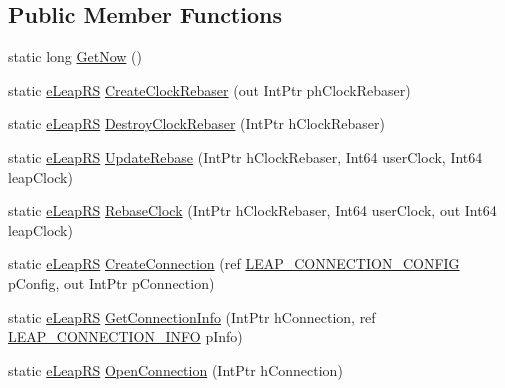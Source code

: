 \subsection*{Public Member Functions}
\begin{DoxyCompactItemize}
\item 
static long \mbox{\hyperlink{class_leap_internal_1_1_leap_c_a92e9bb730041df4094e328bcf326da47}{Get\+Now}} ()
\item 
static \mbox{\hyperlink{namespace_leap_internal_ae50b07d24c508b84273392b6dcbea1d9}{e\+Leap\+RS}} \mbox{\hyperlink{class_leap_internal_1_1_leap_c_aff89b9602b8eae92c47079d89d4be8fc}{Create\+Clock\+Rebaser}} (out Int\+Ptr ph\+Clock\+Rebaser)
\item 
static \mbox{\hyperlink{namespace_leap_internal_ae50b07d24c508b84273392b6dcbea1d9}{e\+Leap\+RS}} \mbox{\hyperlink{class_leap_internal_1_1_leap_c_a72516d54ac9cccc3c7bd8bb064109273}{Destroy\+Clock\+Rebaser}} (Int\+Ptr h\+Clock\+Rebaser)
\item 
static \mbox{\hyperlink{namespace_leap_internal_ae50b07d24c508b84273392b6dcbea1d9}{e\+Leap\+RS}} \mbox{\hyperlink{class_leap_internal_1_1_leap_c_a27dbedabde4b0e1b86cea09687ba3f49}{Update\+Rebase}} (Int\+Ptr h\+Clock\+Rebaser, Int64 user\+Clock, Int64 leap\+Clock)
\item 
static \mbox{\hyperlink{namespace_leap_internal_ae50b07d24c508b84273392b6dcbea1d9}{e\+Leap\+RS}} \mbox{\hyperlink{class_leap_internal_1_1_leap_c_a4c10837b7f5fa82c07eca68c17d3a49d}{Rebase\+Clock}} (Int\+Ptr h\+Clock\+Rebaser, Int64 user\+Clock, out Int64 leap\+Clock)
\item 
static \mbox{\hyperlink{namespace_leap_internal_ae50b07d24c508b84273392b6dcbea1d9}{e\+Leap\+RS}} \mbox{\hyperlink{class_leap_internal_1_1_leap_c_a2a35287387889d78359ce9d0965fa706}{Create\+Connection}} (ref \mbox{\hyperlink{struct_leap_internal_1_1_l_e_a_p___c_o_n_n_e_c_t_i_o_n___c_o_n_f_i_g}{L\+E\+A\+P\+\_\+\+C\+O\+N\+N\+E\+C\+T\+I\+O\+N\+\_\+\+C\+O\+N\+F\+IG}} p\+Config, out Int\+Ptr p\+Connection)
\item 
static \mbox{\hyperlink{namespace_leap_internal_ae50b07d24c508b84273392b6dcbea1d9}{e\+Leap\+RS}} \mbox{\hyperlink{class_leap_internal_1_1_leap_c_abaf56f46dac48027a36aa0c08d94abbf}{Get\+Connection\+Info}} (Int\+Ptr h\+Connection, ref \mbox{\hyperlink{struct_leap_internal_1_1_l_e_a_p___c_o_n_n_e_c_t_i_o_n___i_n_f_o}{L\+E\+A\+P\+\_\+\+C\+O\+N\+N\+E\+C\+T\+I\+O\+N\+\_\+\+I\+N\+FO}} p\+Info)
\item 
static \mbox{\hyperlink{namespace_leap_internal_ae50b07d24c508b84273392b6dcbea1d9}{e\+Leap\+RS}} \mbox{\hyperlink{class_leap_internal_1_1_leap_c_a18543f45477c803f6858299f5b942f5a}{Open\+Connection}} (Int\+Ptr h\+Connection)

\end{DoxyCompactItemize}
